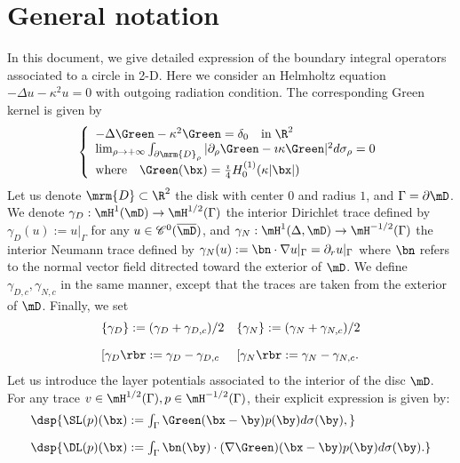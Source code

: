 \documentclass[a4paper,11pt]{article}
\begin{document}
\section{General notation}
In this document, we give detailed expression of the boundary integral operators associated to a circle in 2-D. 
Here we consider an Helmholtz equation   $-\Delta u -\kappa^{2}u = 0$ with outgoing radiation condition.
The corresponding Green kernel is given by
$$
\left\{\begin{array}{l}
-\Delta \Green - \kappa^{2}\Green = \delta_{0}\quad\textrm{in}\;\R^{2}\\
\lim_{\rho\to +\infty}\int_{\partial\mrm{D}_{\rho}}\vert \partial_{\rho}\Green - \imath\kappa \Green\vert^{2}d\sigma_{\rho} = 0\\
\textrm{where}\quad  \Green(\bx) = \frac{\imath}{4}H_{0}^{(1)}(\kappa\vert \bx\vert)
\end{array}\right.
$$
Let us denote $\mrm{D}\subset\R^{2}$ the disk with center $0$ and radius $1$, and $\Gamma = \partial\mD$. 
We denote $\gamma_{D}:\mH^{1}(\mD)\to \mH^{1/2}(\Gamma)$ the interior Dirichlet trace defined by $\gamma_{D}(u):= u\vert_{\Gamma}$
for any $u\in \mathscr{C}^{0}(\overline{\mD})$, and  $\gamma_{N}:\mH^{1}(\Delta,\mD)\to \mH^{-1/2}(\Gamma)$ the interior 
Neumann trace defined by $\gamma_{N}(u) := \bn\cdot\nabla u\vert_{\Gamma} = \partial_{r}u\vert_{\Gamma}$ where $\bn$ refers to 
the normal vector field ditrected toward the exterior of $\mD$. We define $\gamma_{D,c},\gamma_{N,c}$ in the 
same manner, except that the traces are taken from the exterior of $\mD$. Finally, we set 
$$
\begin{array}{ll}
\{\gamma_{D}\}:= (\gamma_{D}+\gamma_{D,c})/2 &  \{\gamma_{N}\}:= (\gamma_{N}+\gamma_{N,c})/2\\[10pt]
\lbrack\gamma_{D}\rbr:=\gamma_{D}-\gamma_{D,c} & \lbrack\gamma_{N}\rbr:=\gamma_{N}-\gamma_{N,c}.
\end{array}
$$
Let us introduce the layer potentials associated to the interior of the disc $\mD$. 
For any trace $v\in\mH^{1/2}(\Gamma), p\in\mH^{-1/2}(\Gamma)$, their explicit expression 
is given by:
$$
\begin{array}{l}
\dsp{ \SL(p)(\bx):=\int_{\Gamma}\Green(\bx-\by)p(\by) d\sigma(\by), }\\[10pt]
\dsp{ \DL(p)(\bx):=\int_{\Gamma}\bn(\by)\cdot(\nabla\Green)(\bx-\by)p(\by) d\sigma(\by). }
\end{array}
$$
\end{document}
